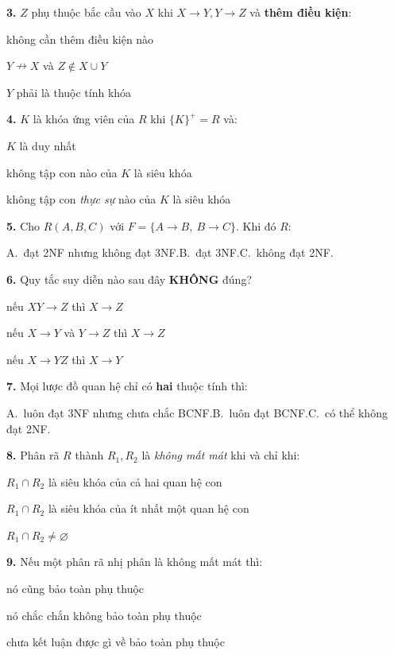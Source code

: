 \documentclass[11pt,a4paper]{article}
\newcommand{\cau}[2]{\par\textbf{#1.} #2\par}
\newcommand{\pangang}[1]{\par{\small\hspace*{2.1em}#1\par}}
\begin{document}
\cau{3}{$Z$ phụ thuộc bắc cầu vào $X$ khi $X\to Y, Y\to Z$ và \textbf{thêm điều kiện}:}
\begin{pa}
\item không cần thêm điều kiện nào
\item $Y\nrightarrow X$ và $Z\notin X\cup Y$
\item $Y$ phải là thuộc tính khóa
\end{pa}

\cau{4}{$K$ là khóa ứng viên của $R$ khi $\{K\}^+=R$ và:}
\begin{pa}
\item $K$ là duy nhất
\item không tập con nào của $K$ là siêu khóa
\item không tập con \textit{thực sự} nào của $K$ là siêu khóa
\end{pa}

\cau{5}{Cho $R(A,B,C)$ với $F=\{A\to B,\ B\to C\}$. Khi đó $R$:}
\pangang{A.~đạt 2NF nhưng không đạt 3NF.\qquad B.~đạt 3NF.\qquad C.~không đạt 2NF.}

\cau{6}{Quy tắc suy diễn nào sau đây \textbf{KHÔNG} đúng?}
\begin{pa}
\item nếu $XY\to Z$ thì $X\to Z$
\item nếu $X\to Y$ và $Y\to Z$ thì $X\to Z$
\item nếu $X\to YZ$ thì $X\to Y$
\end{pa}

\cau{7}{Mọi lược đồ quan hệ chỉ có \textbf{hai} thuộc tính thì:}
\pangang{A.~luôn đạt 3NF nhưng chưa chắc BCNF.\qquad B.~luôn đạt BCNF.\qquad C.~có thể không đạt 2NF.}

\cau{8}{Phân rã $R$ thành $R_1, R_2$ là \textit{không mất mát} khi và chỉ khi:}
\begin{pa}
\item $R_1\cap R_2$ là siêu khóa của cả hai quan hệ con
\item $R_1\cap R_2$ là siêu khóa của ít nhất một quan hệ con
\item $R_1\cap R_2\neq\varnothing$
\end{pa}

\cau{9}{Nếu một phân rã nhị phân là không mất mát thì:}
\begin{pa}
\item nó cũng bảo toàn phụ thuộc
\item nó chắc chắn không bảo toàn phụ thuộc
\item chưa kết luận được gì về bảo toàn phụ thuộc
\end{pa}
\end{document}
